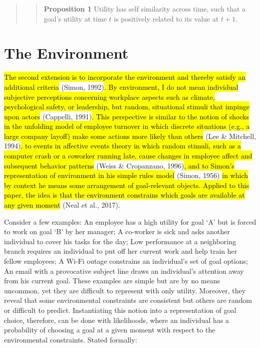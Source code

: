 \documentclass[english,,man]{apa6}
\theoremstyle{definition}
\theoremstyle{definition}
\theoremstyle{definition}
\theoremstyle{remark}
\begin{document}
\begin{quote}
\begin{quote}
\textbf{Proposition 1} Utility has self similarity across time, such
that a goal's utility at time \(t\) is positively related to its value
at \(t + 1\).
\end{quote}
\end{quote}

\hypertarget{the-environment}{%
\section{The Environment}\label{the-environment}}

\hl{The second extension is to incorporate the environment and thereby satisfy an additional criteria}
(Simon,
1992)\hl{. By environment, I do not mean individual subjective perceptions concerning workplace aspects such as climate, psychological safety, or leadership, but random, situational stimuli that impinge upon actors }(Cappelli,
1991)\hl{. This perspective is similar to the notion of shocks in the unfolding model of employee turnover in which discrete situations (e.g., a large company layoff) make some actions more likely than others }(Lee
\& Mitchell,
1994)\hl{, to events in affective events theory in which random stimuli, such as a computer crash or a coworker running late, cause changes in employee affect and subsequent behavior patterns }(Weiss
\& Cropanzano,
1996)\hl{, and to Simon's representation of environment in his simple rules model }(Simon,
1956)\hl{ in which by context he means some arrangement of goal-relevant objects. Applied to this paper, the idea is that the environment constrains which goals are available at any given moment }(Neal
et al., 2017).

Consider a few examples: An employee has a high utility for goal `A' but
is forced to work on goal `B' by her manager; A co-worker is sick and
asks another individual to cover his tasks for the day; Low performance
at a neighboring branch requires an individual to put off her current
work and help train her fellow employees; A Wi-Fi outage constrains an
individual's set of goal options; An email with a provocative subject
line draws an individual's attention away from his current goal. These
examples are simple but are by no means uncommon, yet they are difficult
to represent with only utility. Moreover, they reveal that some
environmental constraints are consistent but others are random or
difficult to predict. Instantiating this notion into a representation of
goal choice, therefore, can be done with likelihoods, where an
individual has a probability of choosing a goal at a given moment with
respect to the environmental constraints. Stated formally:
\end{document}
